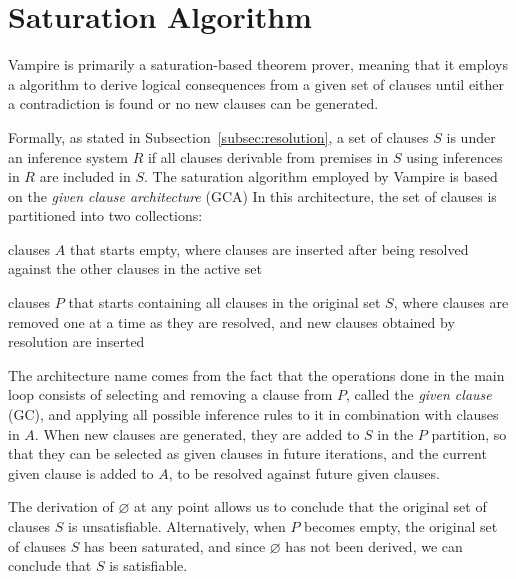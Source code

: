 \section{Saturation Algorithm}\label{sec:saturation-algorithm}

Vampire is primarily a saturation-based theorem prover, meaning that it employs a  algorithm to derive logical consequences from a given set of clauses until either a contradiction is found or no new clauses can be generated.

Formally, as stated in Subsection~\ref{subsec:resolution}, a set of clauses \(S\) is  under an inference system \(R\) if all clauses derivable from premises in \(S\) using inferences in \(R\) are included in \(S\).
The saturation algorithm employed by Vampire is based on the \emph{given clause architecture} (GCA)
In this architecture, the set of clauses is partitioned into two collections:

\begin{enumerate*}[label= (\roman*)]
  \item {} clauses \(A\) that starts empty, where clauses are inserted after being resolved against the other clauses in the active set
  \item {} clauses \(P\) that starts containing all clauses in the original set \(S\), where clauses are removed one at a time as they are resolved, and new clauses obtained by resolution are inserted
\end{enumerate*}

The architecture name comes from the fact that the operations done in the main loop consists of selecting and removing a clause from \(P\), called the \emph{given clause} (GC), and applying all possible inference rules to it in combination with clauses in \(A\).
When new clauses are generated, they are added to \(S\) in the \(P\) partition, so that they can be selected as given clauses in future iterations, and the current given clause is added to \(A\), to be resolved against future given clauses.

The derivation of \(\varnothing\) at any point allows us to conclude that the original set of clauses \(S\) is unsatisfiable.
Alternatively, when \(P\) becomes empty, the original set of clauses \(S\) has been saturated, and since \(\varnothing\) has not been derived, we can conclude that \(S\) is satisfiable.

